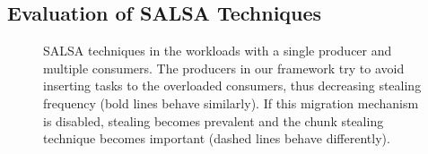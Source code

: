 \subsection{Evaluation of SALSA Techniques}
\label{sec:eval-techniques}
\begin{figure}[htb]
	\centering
	\caption{\footnotesize{SALSA techniques in the workloads with a single producer and multiple consumers. The producers in our framework try to avoid inserting tasks to the overloaded consumers, thus decreasing stealing frequency (bold lines behave similarly). If this migration mechanism is disabled, stealing becomes prevalent and the chunk stealing technique becomes important (dashed lines behave differently). }}
	\label{fig:1-n-salsa}
\end{figure}
